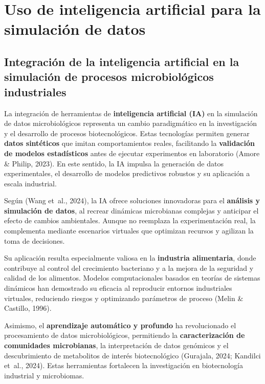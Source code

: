 \documentclass[
  spanish,
  letterpaper,
  DIV=11,
  numbers=noendperiod]{scrreprt}
\begin{document}

\chapter{Uso de inteligencia artificial para la simulación de
datos}\label{uso-de-inteligencia-artificial-para-la-simulaciuxf3n-de-datos}

\section{Integración de la inteligencia artificial en la simulación de
procesos microbiológicos
industriales}\label{integraciuxf3n-de-la-inteligencia-artificial-en-la-simulaciuxf3n-de-procesos-microbioluxf3gicos-industriales}

La integración de herramientas de \textbf{inteligencia artificial (IA)}
en la simulación de datos microbiológicos representa un cambio
paradigmático en la investigación y el desarrollo de procesos
biotecnológicos. Estas tecnologías permiten generar \textbf{datos
sintéticos} que imitan comportamientos reales, facilitando la
\textbf{validación de modelos estadísticos} antes de ejecutar
experimentos en laboratorio (Amore \& Philip, 2023). En este sentido, la
IA impulsa la generación de datos experimentales, el desarrollo de
modelos predictivos robustos y su aplicación a escala industrial.

Según (Wang et~al., 2024), la IA ofrece soluciones innovadoras para el
\textbf{análisis y simulación de datos}, al recrear dinámicas
microbianas complejas y anticipar el efecto de cambios ambientales.
Aunque no reemplaza la experimentación real, la complementa mediante
escenarios virtuales que optimizan recursos y agilizan la toma de
decisiones.

Su aplicación resulta especialmente valiosa en la \textbf{industria
alimentaria}, donde contribuye al control del crecimiento bacteriano y a
la mejora de la seguridad y calidad de los alimentos. Modelos
computacionales basados en teorías de sistemas dinámicos han demostrado
su eficacia al reproducir entornos industriales virtuales, reduciendo
riesgos y optimizando parámetros de proceso (Melin \& Castillo, 1996).

Asimismo, el \textbf{aprendizaje automático y profundo} ha revolucionado
el procesamiento de datos microbiológicos, permitiendo la
\textbf{caracterización de comunidades microbianas}, la interpretación
de datos genómicos y el descubrimiento de metabolitos de interés
biotecnológico (Gurajala, 2024; Kandilci et~al., 2024). Estas
herramientas fortalecen la investigación en biotecnología industrial y
microbiomas.
\end{document}
